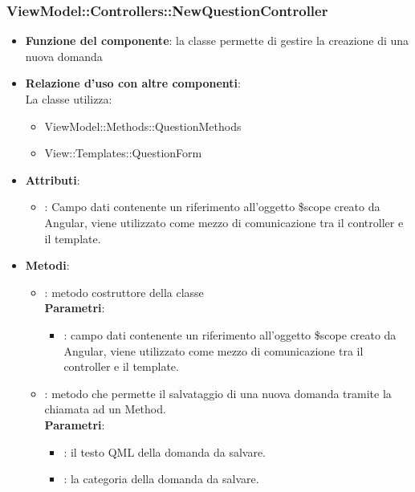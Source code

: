\subsubsection{ViewModel::Controllers::NewQuestionController}
\begin{itemize}
\item\textbf{Funzione del componente}: la classe permette di gestire la creazione di una nuova domanda
	\item\textbf{Relazione d'uso con altre componenti}: \\
La classe utilizza:
	\begin{itemize}
		\item ViewModel::Methods::QuestionMethods
		\item View::Templates::QuestionForm
	\end{itemize}
\item\textbf{Attributi}:
	\begin{itemize}
		\item{}: Campo dati contenente un riferimento all’oggetto \$scope creato da Angular, viene utilizzato come mezzo di comunicazione tra il controller e il template.\\
	\end{itemize}
\item\textbf{Metodi}:
	\begin{itemize}
		\item{}: metodo costruttore della classe\\
		\textbf{Parametri}:
			\begin{itemize}
				\item{}: campo dati contenente un riferimento all’oggetto \$scope creato da Angular, viene utilizzato come mezzo di comunicazione tra il controller e il template.\\
			\end{itemize}
		\item{}: metodo che permette il salvataggio di una nuova domanda tramite la chiamata ad un Method.\\
		\textbf{Parametri}:
			\begin{itemize}
				\item{}: il testo QML della domanda da salvare.\\
				\item{}: la categoria della domanda da salvare.\\
			\end{itemize}
	\end{itemize}
\end{itemize}

